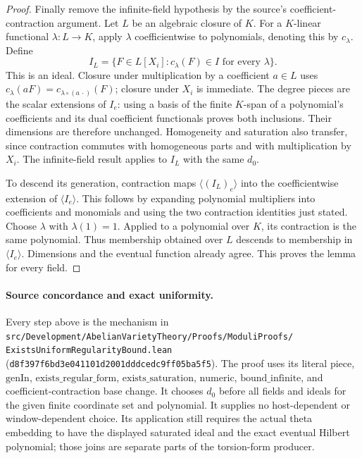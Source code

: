 \begin{proof}
Finally remove the infinite-field hypothesis by the
source's coefficient-contraction argument.
Let \(L\) be an algebraic closure of \(K\).
For a \(K\)-linear functional \(\lambda:L\to K\), apply
\(\lambda\) coefficientwise to polynomials, denoting this
by \(c_\lambda\).
Define
\[
 I_L=\{F\in L[X_i]:c_\lambda(F)\in I
                              \text{ for every }\lambda\}.
\]
This is an ideal.
Closure under multiplication by a coefficient \(a\in L\)
uses \(c_\lambda(aF)=c_{\lambda\circ(a\,\cdot)}(F)\);
closure under \(X_i\) is immediate.
The degree pieces are the scalar extensions of \(I_e\):
using a basis of the finite \(K\)-span of a polynomial's
coefficients and its dual coefficient functionals proves
both inclusions.
Their dimensions are therefore unchanged.
Homogeneity and saturation also transfer, since
contraction commutes with homogeneous parts and with
multiplication by \(X_i\).
The infinite-field result applies to \(I_L\) with the
same \(d_0\).

To descend its generation, contraction maps
\(\langle(I_L)_e\rangle\) into
the coefficientwise extension of \(\langle I_e\rangle\).
This follows by expanding polynomial multipliers into
coefficients and monomials and using the two
contraction identities just stated.
Choose \(\lambda\) with \(\lambda(1)=1\).
Applied to a polynomial over \(K\), its contraction is
the same polynomial.
Thus membership obtained over \(L\) descends to
membership in \(\langle I_e\rangle\).
Dimensions and the eventual function already agree.
This proves the lemma for every field.
\end{proof}

\paragraph{Source concordance and exact uniformity.}
Every step above is the mechanism in
\texttt{src/Development/AbelianVarietyTheory/Proofs/ModuliProofs/%
ExistsUniformRegularityBound.lean}
(\texttt{d8f397f6bd3e041101d2001dddcedc9ff05ba5f5}).
The proof uses its literal
\(\mathrm{piece}\), \(\mathrm{genIn}\),
\(\mathrm{exists\_regular\_form}\),
\(\mathrm{exists\_saturation}\),
\(\mathrm{numeric}\), \(\mathrm{bound\_infinite}\), and
coefficient-contraction base change.
It chooses \(d_0\) before all fields and ideals for the
given finite coordinate set and polynomial.
It supplies no host-dependent or window-dependent
choice.  Its application still requires the actual
theta embedding to have the displayed saturated ideal
and the exact eventual Hilbert polynomial; those joins
are separate parts of the torsion-form producer.
